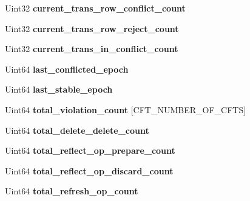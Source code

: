 \begin{DoxyCompactItemize}
\mbox{\label{structst__ndb__slave__state_ac83cea81fc0ba8c48abf501cac67d49a}} 
Uint32 {\bfseries current\+\_\+trans\+\_\+row\+\_\+conflict\+\_\+count}
\item 
\mbox{\label{structst__ndb__slave__state_aa2446b55640bc17e12e283a9e8a66734}} 
Uint32 {\bfseries current\+\_\+trans\+\_\+row\+\_\+reject\+\_\+count}
\item 
\mbox{\label{structst__ndb__slave__state_ac4124518fa8105ab434a166e2cb72759}} 
Uint32 {\bfseries current\+\_\+trans\+\_\+in\+\_\+conflict\+\_\+count}
\item 
\mbox{\label{structst__ndb__slave__state_aeb250896ded8204bfdb847e2e12e0503}} 
Uint64 {\bfseries last\+\_\+conflicted\+\_\+epoch}
\item 
\mbox{\label{structst__ndb__slave__state_a524c15d2a9e28c4be73760783c46064f}} 
Uint64 {\bfseries last\+\_\+stable\+\_\+epoch}
\item 
\mbox{\label{structst__ndb__slave__state_a9971838dc74644fa2fd9c119a1376ef7}} 
Uint64 {\bfseries total\+\_\+violation\+\_\+count} \mbox{[}C\+F\+T\+\_\+\+N\+U\+M\+B\+E\+R\+\_\+\+O\+F\+\_\+\+C\+F\+TS\mbox{]}
\item 
\mbox{\label{structst__ndb__slave__state_a1019087e6ae474dafde8a4bb7a556a2b}} 
Uint64 {\bfseries total\+\_\+delete\+\_\+delete\+\_\+count}
\item 
\mbox{\label{structst__ndb__slave__state_a704dadf0b9e8491f12f2d1ee6b2638fb}} 
Uint64 {\bfseries total\+\_\+reflect\+\_\+op\+\_\+prepare\+\_\+count}
\item 
\mbox{\label{structst__ndb__slave__state_a9beaaa9b8b2c4d5887b07eae504a85d8}} 
Uint64 {\bfseries total\+\_\+reflect\+\_\+op\+\_\+discard\+\_\+count}
\item 
\mbox{\label{structst__ndb__slave__state_a3740b37909b9cad0ef1d0ba178666d0c}} 
Uint64 {\bfseries total\+\_\+refresh\+\_\+op\+\_\+count}

\end{DoxyCompactItemize}
